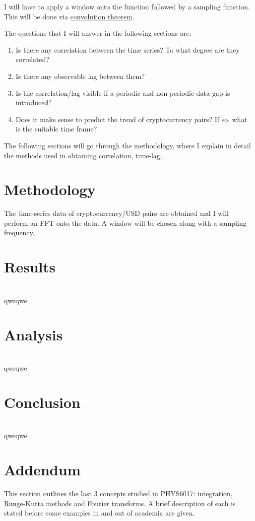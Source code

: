 \documentclass[a4paper, 10pt, conference]{ieeeconf}      %
\begin{document}
I will have to apply a window onto the function followed by a sampling function. This will be done via \hyperref[convolution]{convolution theorem}.

The questions that I will answer in the following sections are:
\begin{enumerate}
    \item Is there any correlation between the time series? To what degree are they correlated? %
    \item Is there any observable lag between them? %
    \item Is the correlation/lag visible if a periodic and non-periodic data gap is introduced? %
    \item Does it make sense to predict the trend of cryptocurrency pairs? If so, what is the suitable time frame? %
\end{enumerate}

The following sections will go through the methodology, where I explain in detail the methods used in obtaining correlation, time-lag, 
\section{Methodology}
The time-series data of cryptocurrency/USD pairs are obtained and I will perform an FFT onto the data. A window will be chosen along with a sampling frequency. 

\section{Results}
\\qweqwe
\section{Analysis}
\\qweqwe
\section{Conclusion}
\\qweqwe
\section{Addendum}{\label{addendum}}
This section outlines the last 3 concepts studied in PHYS6017: integration, Runge-Kutta methods and Fourier transforms. A brief description of each is stated before some examples in and out of academia are given.
\\
\end{document}
